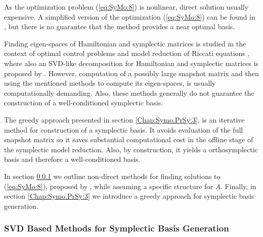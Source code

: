 As the optimization problem (\ref{eq:SyMo:8}) is nonlinear, direct solution usually expensive. A simplified version of the optimization (\ref{eq:SyMo:8}) can be found in \cite{Peng:2014di}, but there is no guarantee that the method provides a near optimal basis. 

{\edit Finding eigen-spaces of Hamiltonian and symplectic matrices is studied in the context of optimal control problems \cite{Benner:2000ww,Benner:1997ef,Watkins:2004kz,BunseGerstner:1986dg} and model reduction of Riccati equations \cite{Benner:1997ef}, where also an SVD-like decomposition for Hamiltonian and symplectic matrices is proposed by \cite{Xu:2003kx}. However, computation of a possibly large snapshot matrix and then using the mentioned methods to compute its eigen-spaces, is usually computationally demanding. Also, these methods generally do not guarantee the construction of a well-conditioned symplectic basis.
	
The greedy approach presented in section \ref{Chap:Symo.PrSy:3}, is an iterative method for construction of a symplectic basis. It avoids evaluation of the full snapshot matrix so it saves substantial computational cost in the offline stage of the symplectic model reduction. Also, by construction, it yields a orthosymplectic basis and therefore a well-conditioned basis.

In section \ref{chap:SyMo.PrSy:2} we outline non-direct methods for finding solutions to (\ref{eq:SyMo:8}), proposed by \cite{Peng:2014di}, while assuming a specific structure for $A$. Finally, in section \ref{Chap:Symo.PrSy:3} we introduce a greedy approach for symplectic basis generation.}

\subsubsection{SVD Based Methods for Symplectic Basis Generation} \label{chap:SyMo.PrSy:2} 



